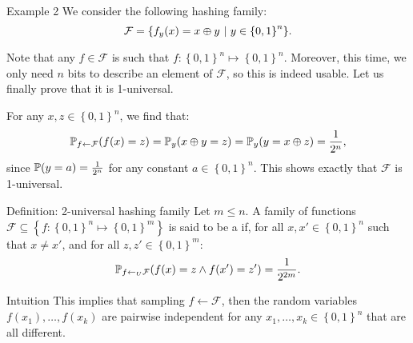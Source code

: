 \documentclass[a4paper]{article}
\begin{document}
\begin{parag}{Example 2}
    We consider the following hashing family: 
    \[\mathcal{F} = \left\{f_y\left(x\right) = x \oplus y \suchthat y \in \left\{0, 1\right\}^n\right\}.\]
    
    Note that any $f \in \mathcal{F}$ is such that $f: \left\{0, 1\right\}^n \mapsto \left\{0, 1\right\}^n$. Moreover, this time, we only need $n$ bits to describe an element of $\mathcal{F}$, so this is indeed usable. Let us finally prove that it is 1-universal.

    For any $x, z \in \left\{0, 1\right\}^n$, we find that: 
    \[\prob_{f \leftarrow \mathcal{F}}\left(f\left(x\right) = z\right) = \prob_y\left(x \oplus y = z\right) = \prob_y\left(y = x \oplus z\right) = \frac{1}{2^n},\]
    since $\prob\left(y = a\right) = \frac{1}{2^n}$ for any constant $a \in \left\{0, 1\right\}^n$. This shows exactly that $\mathcal{F}$ is 1-universal.
\end{parag}

\begin{parag}{Definition: 2-universal hashing family}
    Let $m \leq n$. A family of functions $\mathcal{F} \subseteq \left\{f: \left\{0, 1\right\}^n \mapsto \left\{0, 1\right\}^m\right\}$ is said to be a  if, for all $x, x' \in \left\{0, 1\right\}^n$ such that $x \neq x'$, and for all $z, z' \in \left\{0, 1\right\}^m$: 
    \[\prob_{f \leftarrow_U \mathcal{F}}\left(f\left(x\right) = z \land f\left(x'\right) = z'\right) = \frac{1}{2^{2m}}.\]

    \begin{subparag}{Intuition}
        This implies that sampling $f \leftarrow \mathcal{F}$, then the random variables $f\left(x_1\right), \ldots, f\left(x_k\right)$ are pairwise independent for any $x_1, \ldots, x_k \in \left\{0, 1\right\}^n$ that are all different.
    \end{subparag}
\end{parag}
\end{document}

